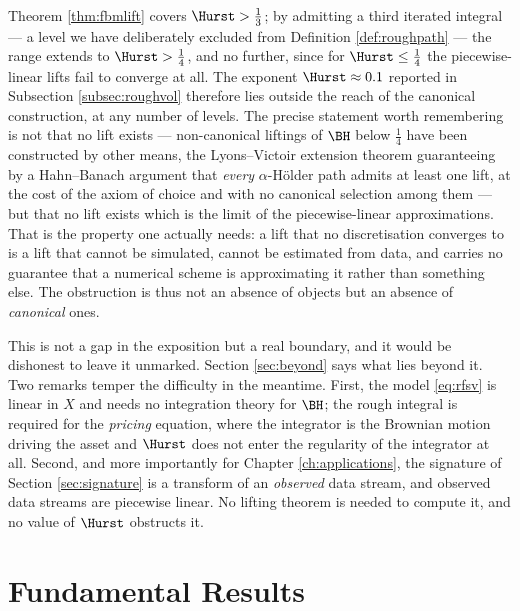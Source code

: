 \begin{remark}\label{rem:H01outside}
Theorem \ref{thm:fbmlift} covers $\Hurst > \tfrac13$; by admitting a third iterated integral --- a
level we have deliberately excluded from Definition \ref{def:roughpath} --- the range extends to
$\Hurst > \tfrac14$, and no further, since for $\Hurst \leq \tfrac14$ the piecewise-linear lifts
fail to converge at all. The exponent $\Hurst \approx 0.1$ reported in Subsection \ref{subsec:roughvol} therefore lies
outside the reach of the canonical construction, at any number of levels. The precise statement
worth remembering is not that no lift exists --- non-canonical liftings of $\BH$ below $\tfrac14$
have been constructed by other means, the Lyons--Victoir extension theorem
\cite{lyonsvictoir2007} guaranteeing by a Hahn--Banach argument that \emph{every} $\alpha$-Hölder
path admits at least one lift, at the cost of the axiom of choice and with no canonical selection
among them --- but that no lift exists which is the limit of the
piecewise-linear approximations. That is the property one actually needs: a lift that no
discretisation converges to is a lift that cannot be simulated, cannot be estimated from data, and
carries no guarantee that a numerical scheme is approximating it rather than something else. The
obstruction is thus not an absence of objects but an absence of \emph{canonical} ones.

This is not a gap in the exposition but a real boundary, and it would be dishonest to leave it
unmarked. Section \ref{sec:beyond} says what lies beyond it. Two remarks temper the difficulty in
the meantime. First, the model \eqref{eq:rfsv} is linear in $X$ and needs no integration theory for
$\BH$; the rough integral is required for the \emph{pricing} equation, where the integrator is the
Brownian motion driving the asset and $\Hurst$ does not enter the regularity of the integrator at
all. Second, and more importantly for Chapter \ref{ch:applications}, the signature of Section
\ref{sec:signature} is a transform of an \emph{observed} data stream, and observed data streams are
piecewise linear. No lifting theorem is needed to compute it, and no value of $\Hurst$ obstructs it.
\end{remark}

\section{Fundamental Results}\label{sec:fundamentalresults}

